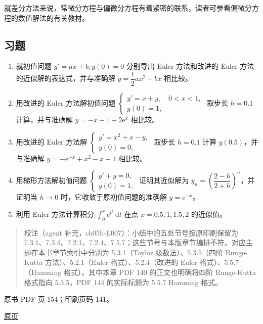 就差分方法来说，常微分方程与偏微分方程有着紧密的联系，读者可参看偏微分方程的数值解法的有关教材。

\subsection{习题}\label{ch05b-ux4e60ux9898}

\begin{enumerate}
\def\labelenumi{\arabic{enumi}.}
\item
  就初值问题 \(y'=ax+b,y(0)=0\) 分别导出 Euler 方法和改进的 Euler 方法的近似解的表达式，并与准确解 \(y=\dfrac12ax^2+bx\) 相比较。
\item
  用改进的 Euler 方法解初值问题 \(\begin{cases}y'=x+y,\quad0<x<1,\\y(0)=1,\end{cases}\) 取步长 \(h=0.1\) 计算，并与准确解 \(y=-x-1+2\mathrm e^x\) 相比较。
\item
  用改进的 Euler 方法解 \(\begin{cases}y'=x^2+x-y,\\y(0)=0,\end{cases}\) 取步长 \(h=0.1\) 计算 \(y(0.5)\)，并与准确解 \(y=-\mathrm e^{-x}+x^2-x+1\) 相比较。
\item
  用梯形方法解初值问题 \(\begin{cases}y'+y=0,\\y(0)=1,\end{cases}\) 证明其近似解为 \(y_n=\left(\dfrac{2-h}{2+h}\right)^n\)，并证明当 \(h\to0\) 时，它收敛于原初值问题的准确解 \(y=\mathrm e^{-x}\)。
\item
  利用 Euler 方法计算积分 \(\displaystyle\int_0^x\mathrm e^{t^2}\,\mathrm dt\) 在点 \(x=0.5,1,1.5,2\) 的近似值。
\end{enumerate}

\begin{quote}
校注（agent 补充，ch05b-E007）：小结中的五处节号按原印刷保留为 7.3.1、7.3.4、7.2.1、7.2.4、7.5.7；这些节号与本版章节编排不符。对应主题在本书章节索引中分别为 5.3.1（Taylor 级数法）、5.3.5（四阶 Runge-Kutta 方法）、5.2.1（Euler 格式）、5.2.4（改进的 Euler 格式）、5.5.7（Hamming 格式）。其中本章 PDF 140 的正文也明确将四阶 Runge-Kutta 格式指向 5.3.5，PDF 144 的实际标题为 5.5.7 Hamming 格式。
\end{quote}

\clearpage

原书 PDF 页 154；印刷页码 141。

\href{source-images/pdf-154.jpeg}{原页}

